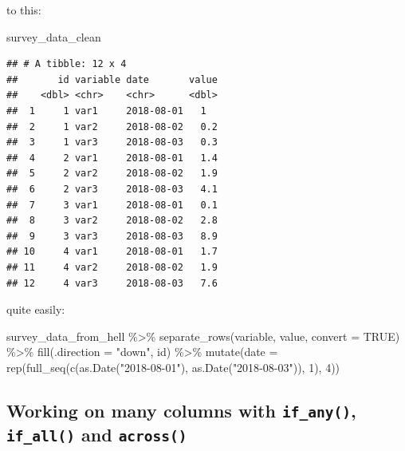 \documentclass[
]{article}
\newenvironment{Shaded}{\begin{snugshade}}{\end{snugshade}}
\newcommand{\AttributeTok}[1]{\textcolor[rgb]{0.77,0.63,0.00}{#1}}
\newcommand{\ConstantTok}[1]{\textcolor[rgb]{0.00,0.00,0.00}{#1}}
\newcommand{\DecValTok}[1]{\textcolor[rgb]{0.00,0.00,0.81}{#1}}
\newcommand{\FunctionTok}[1]{\textcolor[rgb]{0.00,0.00,0.00}{#1}}
\newcommand{\NormalTok}[1]{#1}
\newcommand{\SpecialCharTok}[1]{\textcolor[rgb]{0.00,0.00,0.00}{#1}}
\newcommand{\StringTok}[1]{\textcolor[rgb]{0.31,0.60,0.02}{#1}}
\begin{document}
to this:

\begin{Shaded}
\begin{Highlighting}[]
\NormalTok{survey\_data\_clean}
\end{Highlighting}
\end{Shaded}

\begin{verbatim}
## # A tibble: 12 x 4
##       id variable date       value
##    <dbl> <chr>    <chr>      <dbl>
##  1     1 var1     2018-08-01   1  
##  2     1 var2     2018-08-02   0.2
##  3     1 var3     2018-08-03   0.3
##  4     2 var1     2018-08-01   1.4
##  5     2 var2     2018-08-02   1.9
##  6     2 var3     2018-08-03   4.1
##  7     3 var1     2018-08-01   0.1
##  8     3 var2     2018-08-02   2.8
##  9     3 var3     2018-08-03   8.9
## 10     4 var1     2018-08-01   1.7
## 11     4 var2     2018-08-02   1.9
## 12     4 var3     2018-08-03   7.6
\end{verbatim}

quite easily:

\begin{Shaded}
\begin{Highlighting}[]
\NormalTok{survey\_data\_from\_hell }\SpecialCharTok{\%\textgreater{}\%}
    \FunctionTok{separate\_rows}\NormalTok{(variable, value, }\AttributeTok{convert =} \ConstantTok{TRUE}\NormalTok{) }\SpecialCharTok{\%\textgreater{}\%}
    \FunctionTok{fill}\NormalTok{(}\AttributeTok{.direction =} \StringTok{"down"}\NormalTok{, id) }\SpecialCharTok{\%\textgreater{}\%}
    \FunctionTok{mutate}\NormalTok{(}\AttributeTok{date =} \FunctionTok{rep}\NormalTok{(}\FunctionTok{full\_seq}\NormalTok{(}\FunctionTok{c}\NormalTok{(}\FunctionTok{as.Date}\NormalTok{(}\StringTok{"2018{-}08{-}01"}\NormalTok{), }\FunctionTok{as.Date}\NormalTok{(}\StringTok{"2018{-}08{-}03"}\NormalTok{)), }\DecValTok{1}\NormalTok{), }\DecValTok{4}\NormalTok{))}
\end{Highlighting}
\end{Shaded}

\hypertarget{working-on-many-columns-with-if_any-if_all-and-across}{%
\subsection{\texorpdfstring{Working on many columns with \texttt{if\_any()}, \texttt{if\_all()} and \texttt{across()}}{Working on many columns with if\_any(), if\_all() and across()}}\label{working-on-many-columns-with-if_any-if_all-and-across}}
\end{document}
